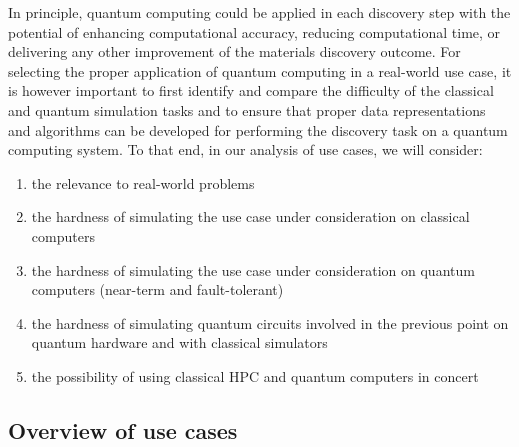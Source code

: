 In principle, quantum computing could be applied in each discovery step with the potential of enhancing computational accuracy, reducing computational time, or delivering any other improvement of the materials discovery outcome. For selecting the proper application of quantum computing in a real-world use case, it is however important to first identify and compare the difficulty of the classical and quantum simulation tasks and to ensure that proper data representations and algorithms can be developed for performing the discovery task on a quantum computing system. To that end, in our analysis of use cases, we will consider:

\begin{enumerate}
\item the relevance to real-world problems
\item the hardness of simulating the use case under consideration on classical computers
\item the hardness of simulating the use case under consideration on quantum computers (near-term and fault-tolerant)
\item the hardness of simulating quantum circuits involved in the previous point on quantum hardware and with classical simulators 
\item the possibility of using classical HPC and quantum computers in concert
\end{enumerate}

\subsection{Overview of use cases}

